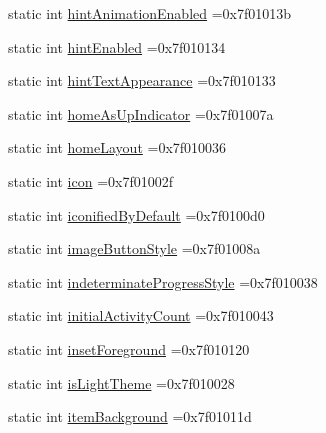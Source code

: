 \begin{DoxyCompactItemize}
\item 
static int \hyperlink{classandroid_1_1support_1_1graphics_1_1drawable_1_1R_1_1attr_a96824c8d48c3017dd0562becfef4f048}{hint\+Animation\+Enabled} =0x7f01013b
\item 
static int \hyperlink{classandroid_1_1support_1_1graphics_1_1drawable_1_1R_1_1attr_a5b62ec915ece6a81f6f874588ef73c43}{hint\+Enabled} =0x7f010134
\item 
static int \hyperlink{classandroid_1_1support_1_1graphics_1_1drawable_1_1R_1_1attr_acbae1188d572cb757a30ffe2b5fbbee2}{hint\+Text\+Appearance} =0x7f010133
\item 
static int \hyperlink{classandroid_1_1support_1_1graphics_1_1drawable_1_1R_1_1attr_acd2ae5212bb78456235e3ccfd0c730a0}{home\+As\+Up\+Indicator} =0x7f01007a
\item 
static int \hyperlink{classandroid_1_1support_1_1graphics_1_1drawable_1_1R_1_1attr_ac848f16dcd4fc6b8f97cf5746d81fb9c}{home\+Layout} =0x7f010036
\item 
static int \hyperlink{classandroid_1_1support_1_1graphics_1_1drawable_1_1R_1_1attr_ae427ff2b20d6460c3df38b8abc719def}{icon} =0x7f01002f
\item 
static int \hyperlink{classandroid_1_1support_1_1graphics_1_1drawable_1_1R_1_1attr_a684bf42e6a28461e48fa5949df81326c}{iconified\+By\+Default} =0x7f0100d0
\item 
static int \hyperlink{classandroid_1_1support_1_1graphics_1_1drawable_1_1R_1_1attr_a9e559efd37ab0a462423db7f2283ce93}{image\+Button\+Style} =0x7f01008a
\item 
static int \hyperlink{classandroid_1_1support_1_1graphics_1_1drawable_1_1R_1_1attr_a1b5c755e6edc5f79361ff7d1e80c99f2}{indeterminate\+Progress\+Style} =0x7f010038
\item 
static int \hyperlink{classandroid_1_1support_1_1graphics_1_1drawable_1_1R_1_1attr_a817d3875d93521ec0f7b405184d5b12e}{initial\+Activity\+Count} =0x7f010043
\item 
static int \hyperlink{classandroid_1_1support_1_1graphics_1_1drawable_1_1R_1_1attr_a366c423ad72c9edfc8be24e4cb96c700}{inset\+Foreground} =0x7f010120
\item 
static int \hyperlink{classandroid_1_1support_1_1graphics_1_1drawable_1_1R_1_1attr_a944a417aea3eaf866564a4350a4bd95a}{is\+Light\+Theme} =0x7f010028
\item 
static int \hyperlink{classandroid_1_1support_1_1graphics_1_1drawable_1_1R_1_1attr_ad8b8904cbda1bf47a665ff33356a36ec}{item\+Background} =0x7f01011d
\item 

\end{DoxyCompactItemize}
